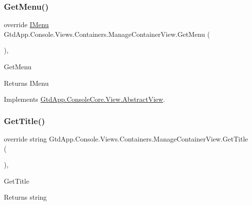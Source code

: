 \subsubsection{\texorpdfstring{Get\+Menu()}{GetMenu()}}
{\footnotesize\ttfamily override \mbox{\hyperlink{interface_gtd_app_1_1_console_core_1_1_menu_1_1_i_menu}{I\+Menu}} Gtd\+App.\+Console.\+Views.\+Containers.\+Manage\+Container\+View.\+Get\+Menu (\begin{DoxyParamCaption}{ }\end{DoxyParamCaption})\hspace{0.3cm}{\ttfamily [protected]}, {\ttfamily [virtual]}}



Get\+Menu 

\begin{DoxyReturn}{Returns}
I\+Menu
\end{DoxyReturn}


Implements \mbox{\hyperlink{class_gtd_app_1_1_console_core_1_1_view_1_1_abstract_view_a04360e549fc462f357300c59fa7fadab}{Gtd\+App.\+Console\+Core.\+View.\+Abstract\+View}}.

\mbox{\label{class_gtd_app_1_1_console_1_1_views_1_1_containers_1_1_manage_container_view_a027fb56977b1f2937bcf3fbd42505b57}} 
\subsubsection{\texorpdfstring{Get\+Title()}{GetTitle()}}
{\footnotesize\ttfamily override string Gtd\+App.\+Console.\+Views.\+Containers.\+Manage\+Container\+View.\+Get\+Title (\begin{DoxyParamCaption}{ }\end{DoxyParamCaption})\hspace{0.3cm}{\ttfamily [protected]}, {\ttfamily [virtual]}}



Get\+Title 

\begin{DoxyReturn}{Returns}
string
\end{DoxyReturn}



